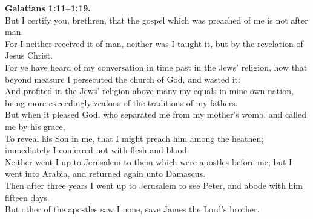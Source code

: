 \documentclass[10pt]{article} %
\begin{document}
{\begin{minipage}[t]{0.45\textwidth}
\textbf{Galatians 1:11--1:19.}\\
But I certify you, brethren, that the gospel which was preached of me is not after man.\\
For I neither received it of man, neither was I taught it, but by the revelation of Jesus Christ.\\
For ye have heard of my conversation in time past in the Jews' religion, how that beyond measure I persecuted the church of God, and wasted it:\\
And profited in the Jews' religion above many my equals in mine own nation, being more exceedingly zealous of the traditions of my fathers.\\
But when it pleased God, who separated me from my mother's womb, and called me by his grace,\\
To reveal his Son in me, that I might preach him among the heathen; immediately I conferred not with flesh and blood:\\
Neither went I up to Jerusalem to them which were apostles before me; but I went into Arabia, and returned again unto Damascus.\\
Then after three years I went up to Jerusalem to see Peter, and abode with him fifteen days.\\
But other of the apostles saw I none, save James the Lord's brother.\\

\end{minipage}}
\vspace*{\fill}
\newpage
\Huge%
\vspace*{\fill}
\begin{spacing}{1.2}%
\end{spacing}
\vspace*{\fill}
\end{document}
